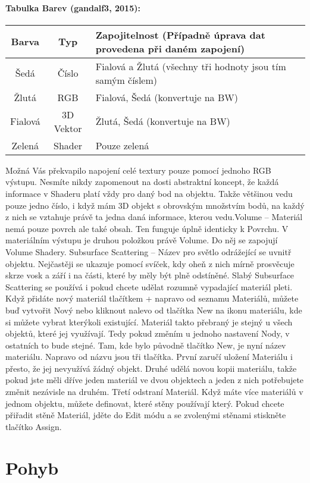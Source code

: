 \documentclass[12pt,a4paper]{report}
\begin{document}
	\paragraph{Tabulka Barev (gandalf3, 2015):}
	\begin{tabular}{ccl}
		\toprule
		Barva
&	Typ
& Zapojitelnost (Případně úprava dat provedena
při daném zapojení)
\\
		\midrule
		Šedá & Číslo & Fialová a Žlutá (všechny tři hodnoty jsou tím
samým číslem)
\\
		Žlutá & RGB & Fialová, Šedá (konvertuje na BW) \\
		Fialová & 3D Vektor & Žlutá, Šedá (konvertuje na BW) \\
		Zelená & Shader & Pouze zelená
	\end{tabular}
	Možná Vás překvapilo napojení celé textury pouze pomocí jednoho RGB
	výstupu. Nesmíte nikdy zapomenout na dosti abstraktní koncept, že
	každá informace v Shaderu platí vždy pro daný bod na objektu. Takže
	většinou vedu pouze jedno číslo, i když mám 3D objekt s obrovským
	množstvím bodů, na každý z nich se vztahuje právě ta jedna daná
	informace, kterou vedu.Volume – Materiál nemá pouze povrch ale také obsah. Ten funguje úplně
	identicky k Povrchu. V materiálním výstupu je druhou položkou právě
	Volume. Do něj se zapojují Volume Shadery.
	Subsurface Scattering – Název pro světlo odrážející se uvnitř objektu.
	Nejčastěji se ukazuje pomocí svíček, kdy oheň z nich mírně prosvěcuje
	skrze vosk a září i na části, které by měly být plně odstíněné. Slabý
	Subsurface Scattering se používá i pokud chcete udělat rozumně
	vypadající materiál pleti.
	Když přidáte nový materiál tlačítkem + napravo od seznamu Materiálů,
	můžete buď vytvořit Nový nebo kliknout nalevo od tlačítka New na ikonu
	materiálu, kde si můžete vybrat kterýkoli existující. Materiál takto
	přebraný je stejný u všech objektů, které jej využívají. Tedy pokud
	změním u jednoho nastavení Nody, v ostatních to bude stejné. Tam, kde
	bylo původně tlačítko New, je nyní název materiálu. Napravo od názvu
	jsou tři tlačítka. První zaručí uložení Materiálu i přesto, že jej nevyužívá
	žádný objekt. Druhé udělá novou kopii materiálu, takže pokud jste měli
	dříve jeden materiál ve dvou objektech a jeden z nich potřebujete změnit
	nezávisle na druhém. Třetí odstraní Materiál.
	Když máte více materiálů v jednom objektu, můžete definovat, které
	stěny používají který. Pokud chcete přiřadit stěně Materiál, jděte do Edit
	módu a se zvolenými stěnami stiskněte tlačítko Assign.
	
	\section{Pohyb}
\end{document}
